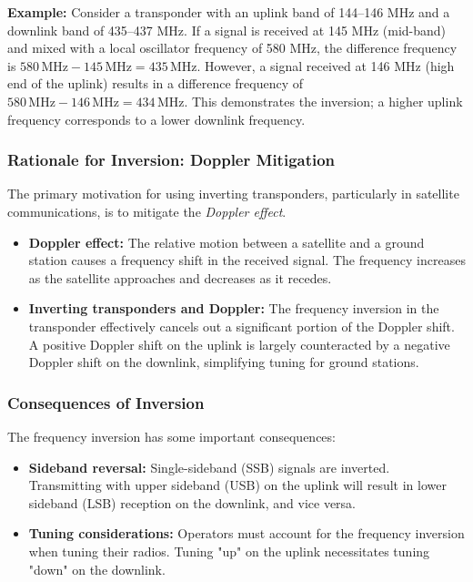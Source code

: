 \textbf{Example:} Consider a transponder with an uplink band of 144–146 MHz and a downlink band of 435–437 MHz. If a signal is received at 145 MHz (mid-band) and mixed with a local oscillator frequency of 580 MHz, the difference frequency is $580 \, \text{MHz} - 145 \, \text{MHz} = 435 \, \text{MHz}$. However, a signal received at 146 MHz (high end of the uplink) results in a difference frequency of $580 \, \text{MHz} - 146 \, \text{MHz} = 434 \, \text{MHz}$. This demonstrates the inversion; a higher uplink frequency corresponds to a lower downlink frequency.

\subsubsection*{Rationale for Inversion: Doppler Mitigation}

The primary motivation for using inverting transponders, particularly in satellite communications, is to mitigate the \textit{Doppler effect}.

\begin{itemize}
    \item \textbf{Doppler effect:} The relative motion between a satellite and a ground station causes a frequency shift in the received signal. The frequency increases as the satellite approaches and decreases as it recedes.
    \item \textbf{Inverting transponders and Doppler:} The frequency inversion in the transponder effectively cancels out a significant portion of the Doppler shift. A positive Doppler shift on the uplink is largely counteracted by a negative Doppler shift on the downlink, simplifying tuning for ground stations.
\end{itemize}

\subsubsection*{Consequences of Inversion}

The frequency inversion has some important consequences:

\begin{itemize}
    \item \textbf{Sideband reversal:} Single-sideband (SSB) signals are inverted. Transmitting with upper sideband (USB) on the uplink will result in lower sideband (LSB) reception on the downlink, and vice versa.
    \item \textbf{Tuning considerations:} Operators must account for the frequency inversion when tuning their radios. Tuning "up" on the uplink necessitates tuning "down" on the downlink.
\end{itemize}

